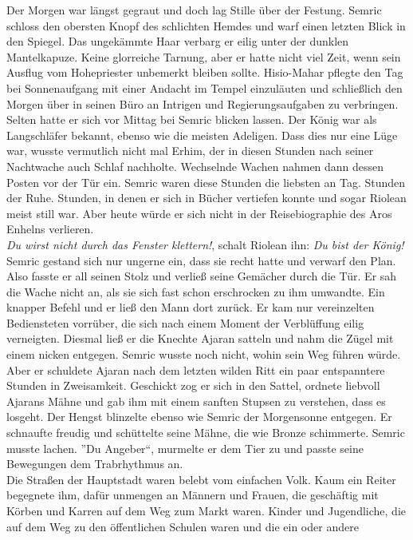 Der Morgen war längst gegraut und doch lag Stille über der Festung. Semric schloss den obersten 
Knopf des schlichten Hemdes und warf einen letzten Blick in den Spiegel. Das ungekämmte Haar 
verbarg er eilig unter der dunklen Mantelkapuze. Keine glorreiche Tarnung, aber er 
hatte nicht viel Zeit, wenn sein Ausflug vom Hohepriester unbemerkt bleiben sollte. Hisio-Mahar 
pflegte den Tag bei Sonnenaufgang mit einer Andacht im Tempel einzuläuten und schließlich den Morgen 
über in seinen Büro an Intrigen und Regierungsaufgaben zu verbringen. Selten hatte er sich vor 
Mittag bei Semric blicken lassen. Der König war als Langschläfer bekannt, ebenso wie die meisten 
Adeligen. Dass dies nur eine Lüge war, wusste vermutlich nicht mal Erhim, der in diesen Stunden nach 
seiner Nachtwache auch Schlaf nachholte. Wechselnde Wachen nahmen dann dessen Posten vor der Tür 
ein. Semric waren diese Stunden die liebsten an Tag. Stunden der Ruhe. Stunden, in denen er sich in 
Bücher vertiefen konnte und sogar Riolean meist still war. Aber heute würde er sich nicht in der 
Reisebiographie des Aros Enhelns verlieren.\\
\textit{Du wirst nicht durch das Fenster klettern!}, schalt Riolean ihn: \textit{Du bist der 
König!}\\
Semric gestand sich nur ungerne ein, dass sie recht hatte und verwarf den Plan. Also fasste er all 
seinen Stolz und verließ seine Gemächer durch die Tür. Er sah die Wache nicht an, als sie sich fast 
schon erschrocken zu ihm umwandte. Ein knapper Befehl und er ließ den Mann dort zurück. Er kam nur 
vereinzelten Bediensteten vorrüber, die sich nach einem Moment der Verblüffung eilig verneigten. 
Diesmal ließ er die Knechte Ajaran satteln und nahm die Zügel mit einem nicken entgegen. Semric 
wusste noch nicht, wohin sein Weg führen würde. Aber er schuldete Ajaran nach dem letzten wilden 
Ritt ein paar entspanntere Stunden in Zweisamkeit. Geschickt zog er sich in den Sattel, ordnete 
liebvoll Ajarans Mähne und gab ihm mit einem sanften Stupsen zu verstehen, dass es losgeht. Der 
Hengst blinzelte ebenso wie Semric der Morgensonne entgegen. Er schnaufte freudig und schüttelte 
seine Mähne, die wie Bronze schimmerte. Semric musste lachen. ''Du Angeber``, murmelte er dem Tier 
zu und passte seine Bewegungen dem Trabrhythmus an.\\
Die Straßen der Hauptstadt waren belebt vom einfachen Volk. Kaum ein Reiter begegnete ihm, dafür 
unmengen an Männern und Frauen, die geschäftig mit Körben und Karren auf dem Weg zum Markt waren. 
Kinder und Jugendliche, die auf dem Weg zu den öffentlichen Schulen waren und die ein oder andere 
